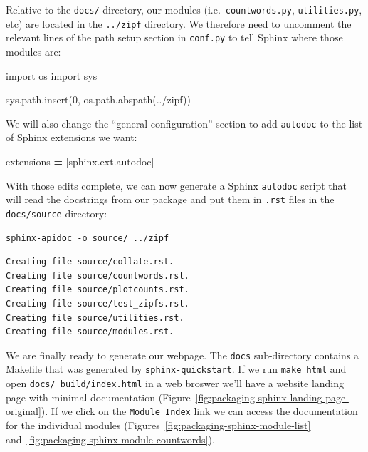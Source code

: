 \documentclass[
]{krantz}
\makeatletter
\newenvironment{Shaded}{\begin{snugshade}}{\end{snugshade}}
\newcommand{\DecValTok}[1]{\textcolor[rgb]{0.00,0.00,0.81}{#1}}
\newcommand{\ImportTok}[1]{#1}
\newcommand{\NormalTok}[1]{#1}
\newcommand{\OperatorTok}[1]{\textcolor[rgb]{0.81,0.36,0.00}{\textbf{#1}}}
\newcommand{\StringTok}[1]{\textcolor[rgb]{0.31,0.60,0.02}{#1}}
\newenvironment{kframe}{%
\medskip{}
\setlength{\fboxsep}{.8em}
 \def\at@end@of@kframe{}%
 \ifinner\ifhmode%
  \def\at@end@of@kframe{\end{minipage}}%
  \begin{minipage}{\columnwidth}%
 \fi\fi%
 \def\FrameCommand##1{\hskip\@totalleftmargin \hskip-\fboxsep
 \colorbox{shadecolor}{##1}\hskip-\fboxsep
     \hskip-\linewidth \hskip-\@totalleftmargin \hskip\columnwidth}%
 \MakeFramed {\advance\hsize-\width
   \@totalleftmargin\z@ \linewidth\hsize
   \@setminipage}}%
 {\par\unskip\endMakeFramed%
 \at@end@of@kframe}
\renewenvironment{Shaded}{\begin{kframe}}{\end{kframe}}
\makeatother
\begin{document}
Relative to the \texttt{docs/} directory,
our modules (i.e.~\texttt{countwords.py}, \texttt{utilities.py}, etc) are located in the \texttt{../zipf} directory.
We therefore need to uncomment the relevant lines of the path setup section in \texttt{conf.py}
to tell Sphinx where those modules are:

\begin{Shaded}
\begin{Highlighting}[]
\ImportTok{import}\NormalTok{ os}
\ImportTok{import}\NormalTok{ sys}

\NormalTok{sys.path.insert(}\DecValTok{0}\NormalTok{, os.path.abspath(}\StringTok{\textquotesingle{}../zipf\textquotesingle{}}\NormalTok{))}
\end{Highlighting}
\end{Shaded}

We will also change the ``general configuration'' section
to add \texttt{autodoc} to the list of Sphinx extensions we want:

\begin{Shaded}
\begin{Highlighting}[]
\NormalTok{extensions }\OperatorTok{=}\NormalTok{ [}\StringTok{\textquotesingle{}sphinx.ext.autodoc\textquotesingle{}}\NormalTok{]}
\end{Highlighting}
\end{Shaded}

With those edits complete,
we can now generate a Sphinx \texttt{autodoc} script
that will read the docstrings from our package
and put them in \texttt{.rst} files in the \texttt{docs/source} directory:

\begin{verbatim}
sphinx-apidoc -o source/ ../zipf
\end{verbatim}

\begin{verbatim}
Creating file source/collate.rst.
Creating file source/countwords.rst.
Creating file source/plotcounts.rst.
Creating file source/test_zipfs.rst.
Creating file source/utilities.rst.
Creating file source/modules.rst.
\end{verbatim}

We are finally ready to generate our webpage.
The \texttt{docs} sub-directory contains a Makefile that was generated by \texttt{sphinx-quickstart}.
If we run \texttt{make\ html} and open \texttt{docs/\_build/index.html} in a web broswer
we'll have a website landing page with minimal documentation (Figure~\ref{fig:packaging-sphinx-landing-page-original}).
If we click on the \texttt{Module\ Index} link we can access the documentation for the individual modules
(Figures~\ref{fig:packaging-sphinx-module-list} and~\ref{fig:packaging-sphinx-module-countwords}).
\end{document}
